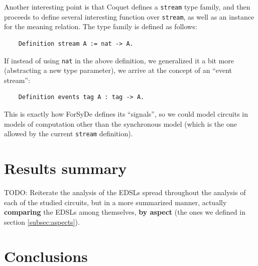 \documentclass[a4paper]{article}
\begin{document}
                Another interesting point is that Coquet defines a \texttt{stream} type family, and
                then proceeds to define several interesting function over \texttt{stream}, as well
                as an instance for the meaning relation. The type family is defined as follows:
                \begin{verbatim}
    Definition stream A := nat -> A.
                \end{verbatim}
                If instead of using \texttt{nat} in the above definition, we generalized it a bit
                more (abstracting a new type parameter), we arrive at the concept of an ``event
                stream'':
                \begin{verbatim}
    Definition events tag A : tag -> A.
                \end{verbatim}
                This is exactly how ForSyDe defines its ``signals'', so we could model circuits in
                models of computation other than the synchronous model (which is the one allowed by
                the current \texttt{stream} definition).



    \section{Results summary}
    \label{sec:results}
        TODO: Reiterate the analysis of the EDSLs spread throughout the analysis of each of the
        studied circuits, but in a more summarized manner, actually \textbf{comparing} the EDSLs
        among themselves, \textbf{by aspect} (the ones we defined in section \ref{subsec:aspects}).

    \section{Conclusions}
    \label{sec:conclusions}


    
    
\end{document}
